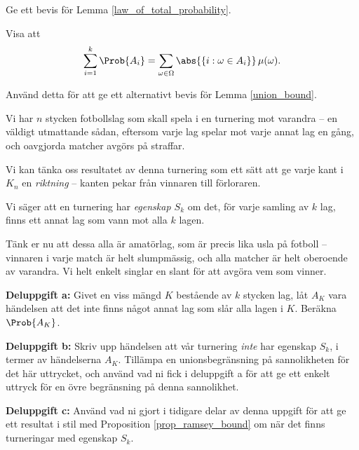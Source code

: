 \documentclass[nobib]{tufte-handout}
\begin{document}
\begin{xca}
    Ge ett bevis för Lemma \ref{law_of_total_probability}.
\end{xca}

\begin{xca}
    Visa att
    $$\sum_{i=1}^{k} \Prob{A_i} = \sum_{\omega \in \Omega} \abs{\left\{i: \omega \in A_i\right\}}\,\mu(\omega).$$

    Använd detta för att ge ett alternativt bevis för Lemma \ref{union_bound}.
\end{xca}

\begin{xca}
    Vi har $n$ stycken fotbollslag som skall spela i en turnering mot varandra -- en väldigt utmattande sådan, eftersom varje lag spelar mot varje annat lag en gång, och oavgjorda matcher avgörs på straffar.

    Vi kan tänka oss resultatet av denna turnering som ett sätt att ge varje kant i $K_n$ en \emph{riktning} -- kanten pekar från vinnaren till förloraren.

    Vi säger att en turnering har \emph{egenskap $S_k$} om det, för varje samling av $k$ lag, finns ett annat lag som vann mot alla $k$ lagen.

    Tänk er nu att dessa alla är amatörlag, som är precis lika usla på fotboll -- vinnaren i varje match är helt slumpmässig, och alla matcher är helt oberoende av varandra. Vi helt enkelt singlar en slant för att avgöra vem som vinner.

    \textbf{Deluppgift a:} Givet en viss mängd $K$ bestående av $k$ stycken lag, låt $A_K$ vara händelsen att det inte finns något annat lag som slår alla lagen i $K$. Beräkna $\Prob{A_K}$.

    \textbf{Deluppgift b:} Skriv upp händelsen att vår turnering \emph{inte} har egenskap $S_k$, i termer av händelserna $A_K$. Tillämpa en unionsbegränsning på sannolikheten för det här uttrycket, och använd vad ni fick i deluppgift a för att ge ett enkelt uttryck för en övre begränsning på denna sannolikhet.

    \textbf{Deluppgift c:} Använd vad ni gjort i tidigare delar av denna uppgift för att ge ett resultat i stil med Proposition \ref{prop_ramsey_bound} om när det finns turneringar med egenskap $S_k$.
\end{xca}
\end{document}
